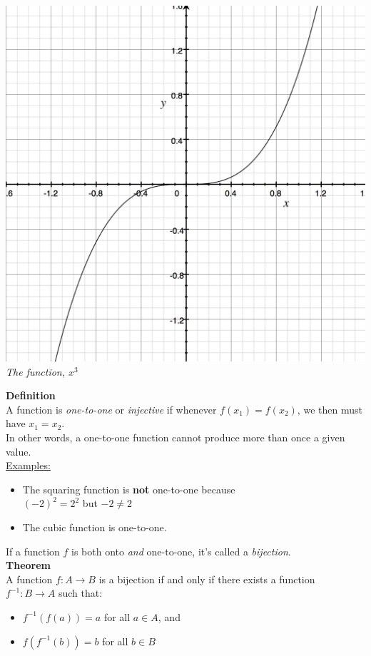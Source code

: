 \documentclass[]{article}
\begin{document}
	\begin{center}
		\includegraphics[scale=0.4]{./graphics/x3.png}\\
		\emph{The function, $x^3$}\\
	\end{center}
	{\bf Definition}\\
	A function is \emph{one-to-one} or \emph{injective} if whenever $f(x_1)=f(x_2)$, we then must have $x_1=x_2$.\\
	In other words, a one-to-one function cannot produce more than once a given value.\\
	\underline{Examples:}\\
	\begin{itemize}
		\item The squaring function is {\bf not} one-to-one because\\
		$(-2)^2=2^2$ but $-2\ne 2$
		\item The cubic function is one-to-one.
	\end{itemize}
	If a function $f$ is both onto \emph{and} one-to-one, it's called a \emph{bijection}.\\
	{\bf Theorem}\\
	A function $f:A\longrightarrow B$ is a bijection if and only if there exists a function $f^{-1}:B\longrightarrow A$ such that:
	\begin{itemize}
		\item $f^{-1}(f(a))=a$ for all $a\in A$, and
		\item $f(f^{-1}(b))=b$ for all $b\in B$
	\end{itemize}
\end{document}
